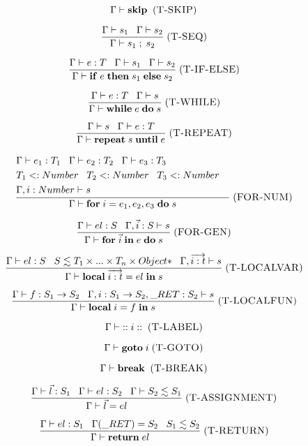 \documentclass[12pt]{article}
\newcommand{\mylabel}[1]{\; (\textsc{#1})}
\newcommand{\subtype}{<:}
\newcommand{\kw}[1]{\mathbf{#1} \;}
\newcommand{\env}{\Gamma}
\newcommand{\ret}{\string_RET}
\begin{document}
\[
\env \vdash \kw{skip}
\mylabel{T-SKIP}
\]

\[
\frac{\env \vdash s_{1} \;\;\;
      \env \vdash s_{2}}
     {\env \vdash s_{1} \;;\; s_{2}}
\mylabel{T-SEQ}
\]

\[
\frac{\env \vdash e:T \;\;\;
      \env \vdash s_{1} \;\;\;
      \env \vdash s_{2}}
     {\env \vdash \kw{if} e \; \kw{then} s_{1} \; \kw{else} s_{2}}
\mylabel{T-IF-ELSE}
\]

\[
\frac{\env \vdash e:T \;\;\;
      \env \vdash s}
     {\env \vdash \kw{while} e \; \kw{do} s}
\mylabel{T-WHILE}
\]

\[
\frac{\env \vdash s \;\;\;
      \env \vdash e:T}
     {\env \vdash \kw{repeat} s \; \kw{until} e}
\mylabel{T-REPEAT}
\]

\[
\frac{\begin{aligned}
      & \env \vdash e_{1}:T_{1} \;\;\;
        \env \vdash e_{2}:T_{2} \;\;\;
        \env \vdash e_{3}:T_{3} &\\
      & T_{1} \subtype Number \;\;\;
        T_{2} \subtype Number \;\;\;
        T_{3} \subtype Number &\\
      & \env, i:Number \vdash s &
      \end{aligned}}
     {\env \vdash \kw{for} i=e_{1},e_{2},e_{3} \; \kw{do} s}
\mylabel{FOR-NUM}
\]

\[
\frac{\env \vdash el:S \;\;\;
      \env, \vec{i}:S \vdash s}
     {\env \vdash \kw{for} \vec{i} \; \kw{in} e \; \kw{do} s}
\mylabel{FOR-GEN}
\]

\[
\frac{\env \vdash el:S \;\;\;
      S \lesssim T_{1} \times ... \times T_{n} \times {Object*} \;\;\;
      \env, \overrightarrow{i:t} \vdash s}
     {\env \vdash \kw{local} \overrightarrow{i:t} = el \; \kw{in} s}
\mylabel{T-LOCALVAR}
\]

\[
\frac{\env \vdash f:S_{1} \rightarrow S_{2} \;\;\;
      \env, i:S_{1} \rightarrow S_{2}, \ret:S_{2} \vdash s}
     {\env \vdash \kw{local} i = f \; \kw{in} s}
\mylabel{T-LOCALFUN}
\]

\[
\env \vdash \kw{::} i \; \kw{::}
\mylabel{T-LABEL}
\]

\[
\env \vdash \kw{goto} i
\mylabel{T-GOTO}
\]

\[
\env \vdash \kw{break}
\mylabel{T-BREAK}
\]

\[
\frac{\env \vdash \vec{l}:S_{1} \;\;\;
      \env \vdash el:S_{2} \;\;\;
      \env \vdash S_{2} \lesssim S_{1}}
     {\env \vdash \vec{l} = el}
\mylabel{T-ASSIGNMENT}
\]

\[
\frac{\env \vdash el:S_{1} \;\;\;
      \env(\ret) = S_{2} \;\;\;
      S_{1} \lesssim S_{2}}
     {\env \vdash \kw{return} el}
\mylabel{T-RETURN}
\]
\end{document}

